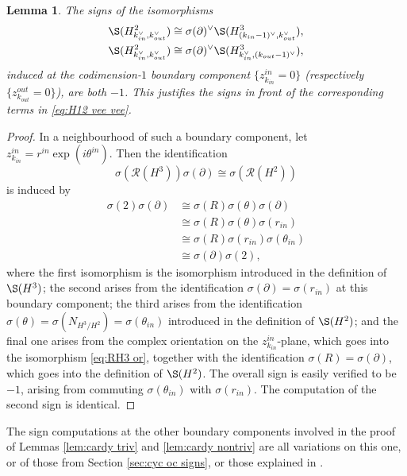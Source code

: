 \documentclass{article}
\newtheorem{lem}{Lemma}[section]
\def\cR{\mathcal{R}}
\begin{document}
\begin{lem}
    The signs of the isomorphisms
    \begin{align*}
    \S(H^2_{k_{in}^\vee,k_{out}^\vee}) & \cong \sigma(\partial)^\vee \S(H^3_{(k_{in}-1)^\vee,k_{out}^\vee}),\\
    \S(H^2_{k_{in}^\vee,k_{out}^\vee}) &\cong \sigma(\partial)^\vee \S(H^3_{k_{in}^\vee,(k_{out}-1)^\vee}),
    \end{align*}
    induced at the codimension-$1$ boundary component $\{z^{in}_{k_{in}}=0\}$ (respectively $\{z^{out}_{k_{out}} = 0\}$), are both $-1$. 
    This justifies the signs in front of the corresponding terms in \eqref{eq:H12 vee vee}.
\end{lem}
\begin{proof}
    In a neighbourhood of such a boundary component, let $z^{in}_{k_{in}} = r^{in} \exp( i\theta^{in})$. 
    Then the identification
    $$\sigma(\cR(H^3)) \sigma(\partial) \cong \sigma(\cR(H^2))$$
    is induced by 
    \begin{align*}
        \sigma(2) \sigma(\partial) &\cong \sigma(R)\sigma(\theta)\sigma(\partial) \\
        & \cong \sigma(R)\sigma(\theta)\sigma(r_{in}) \\
        & \cong \sigma(R)\sigma(r_{in})\sigma(\theta_{in}) \\
        &\cong \sigma(\partial) \sigma(2),
    \end{align*}
    where the first isomorphism is the isomorphism introduced in the definition of $\S(H^3)$; the second arises from the identification $\sigma(\partial) = \sigma(r_{in})$ at this boundary component; the third arises from the identification $\sigma(\theta) = \sigma(N_{H^3/H^2}) = \sigma(\theta_{in})$ introduced in the definition of $\S(H^2)$; and the final one arises from the complex orientation on the $z^{in}_{k_{in}}$-plane, which goes into the isomorphism \eqref{eq:RH3 or}, together with the identification $\sigma(R) = \sigma(\partial)$, which goes into the definition of $\S(H^2)$.
    The overall sign is easily verified to be $-1$, arising from commuting $\sigma(\theta_{in})$ with $\sigma(r_{in})$. 
    The computation of the second sign is identical.
\end{proof}

The sign computations at the other boundary components involved in the proof of Lemmas \ref{lem:cardy triv} and \ref{lem:cardy nontriv} are all variations on this one, or of those from Section \ref{sec:cyc oc signs}, or those explained in \cite[Appendix C]{relfukii}.
\end{document}
